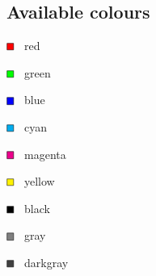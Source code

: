 \documentclass[a4paper, twoside, 8pt]{extarticle}
\begin{document}
\begin{multicols*}{2}
\vfill\null

\subsection*{Available colours}
\begin{multicols*}{3}
$\begin{tikzpicture}[scale=0.5, baseline=-0.65ex]
\filldraw[fill=red, draw=black] (-6pt, -6pt) rectangle (6pt, 6pt);
\end{tikzpicture}$ \, red

$\begin{tikzpicture}[scale=0.5, baseline=-0.65ex]
\filldraw[fill=green, draw=black] (-6pt, -6pt) rectangle (6pt, 6pt);
\end{tikzpicture}$ \, green

$\begin{tikzpicture}[scale=0.5, baseline=-0.65ex]
\filldraw[fill=blue, draw=black] (-6pt, -6pt) rectangle (6pt, 6pt);
\end{tikzpicture}$ \, blue

$\begin{tikzpicture}[scale=0.5, baseline=-0.65ex]
\filldraw[fill=cyan, draw=black] (-6pt, -6pt) rectangle (6pt, 6pt);
\end{tikzpicture}$ \, cyan

$\begin{tikzpicture}[scale=0.5, baseline=-0.65ex]
\filldraw[fill=magenta, draw=black] (-6pt, -6pt) rectangle (6pt, 6pt);
\end{tikzpicture}$ \, magenta

$\begin{tikzpicture}[scale=0.5, baseline=-0.65ex]
\filldraw[fill=yellow, draw=black] (-6pt, -6pt) rectangle (6pt, 6pt);
\end{tikzpicture}$ \, yellow

$\begin{tikzpicture}[scale=0.5, baseline=-0.65ex]
\filldraw[fill=black, draw=black] (-6pt, -6pt) rectangle (6pt, 6pt);
\end{tikzpicture}$ \, black

$\begin{tikzpicture}[scale=0.5, baseline=-0.65ex]
\filldraw[fill=gray, draw=black] (-6pt, -6pt) rectangle (6pt, 6pt);
\end{tikzpicture}$ \, gray

$\begin{tikzpicture}[scale=0.5, baseline=-0.65ex]
\filldraw[fill=darkgray, draw=black] (-6pt, -6pt) rectangle (6pt, 6pt);
\end{tikzpicture}$ \, darkgray


\end{multicols*}
\end{multicols*}
\end{document}
